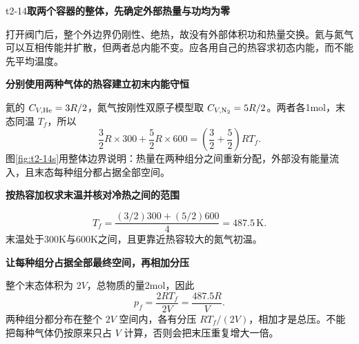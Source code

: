 \begin{drillsolution}{t2-14}\textbf{取两个容器的整体，先确定外部热量与功均为零}\par\nobreak
打开阀门后，整个外边界仍刚性、绝热，故没有外部体积功和热量交换。氦与氮气可以互相传能并扩散，但两者总内能不变。应各用自己的热容求初态内能，而不能先平均温度。


\par\medskip{}\noindent\textbf{分别使用两种气体的热容建立初末内能守恒}\par\nobreak
氦的 $C_{V,\rm He}=3R/2$，氮气按刚性双原子模型取 $C_{V,\rm N_2}=5R/2$。两者各1mol，末态同温 $T_f$，所以
\[\frac32R\times300+\frac52R\times600
=\left(\frac32+\frac52\right)RT_f.\]
图\ref{fig:t2-14s}用整体边界说明：热量在两种组分之间重新分配，外部没有能量流入，且末态每种组分都占据全部空间。



\par\medskip{}\noindent\textbf{按热容加权求末温并核对冷热之间的范围}\par\nobreak
\[\boxed{T_f=\frac{(3/2)300+(5/2)600}{4}=487.5\,\mathrm K}.\]
末温处于300K与600K之间，且更靠近热容较大的氮气初温。

\par\medskip{}\noindent\textbf{让每种组分占据全部最终空间，再相加分压}\par\nobreak
整个末态体积为 $2V$，总物质的量2mol，因此
\[\boxed{p_f=\frac{2RT_f}{2V}=\frac{487.5R}{V}}.\]
两种组分都分布在整个 $2V$ 空间内，各有分压 $RT_f/(2V)$，相加才是总压。不能把每种气体仍按原来只占 $V$ 计算，否则会把末压重复增大一倍。
\end{drillsolution}

